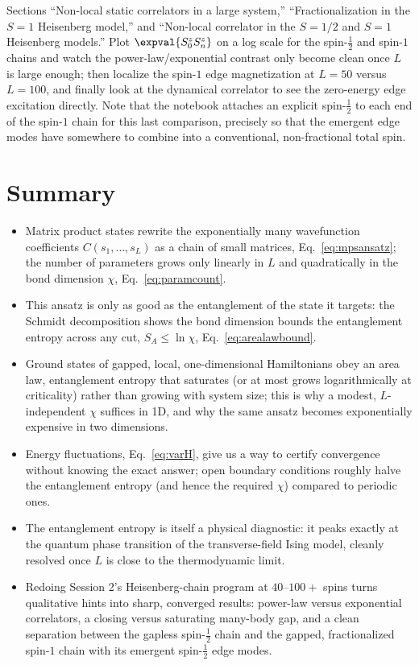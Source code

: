 \documentclass[all_sessions.tex]{subfiles}
\begin{document}
\begin{notebook}
Sections ``Non-local static correlators in a large system,'' ``Fractionalization in the $S=1$
Heisenberg model,'' and ``Non-local correlator in the $S=1/2$ and $S=1$ Heisenberg models.'' Plot
$\expval{S_0^zS_n^z}$ on a log scale for the spin-$\tfrac12$ and spin-$1$ chains and watch the
power-law/exponential contrast only become clean once $L$ is large enough; then localize the
spin-$1$ edge magnetization at $L=50$ versus $L=100$, and finally look at the dynamical correlator
to see the zero-energy edge excitation directly. Note that the notebook attaches an explicit
spin-$\tfrac12$ to each end of the spin-$1$ chain for this last comparison, precisely so that the
emergent edge modes have somewhere to combine into a conventional, non-fractional total spin.
\end{notebook}

\section*{Summary}
\begin{itemize}[nosep]
  \item Matrix product states rewrite the exponentially many wavefunction coefficients
    $C(s_1,\ldots,s_L)$ as a chain of small matrices, Eq.~\eqref{eq:mpsansatz}; the number of
    parameters grows only linearly in $L$ and quadratically in the bond dimension $\chi$,
    Eq.~\eqref{eq:paramcount}.
  \item This ansatz is only as good as the entanglement of the state it targets: the Schmidt
    decomposition shows the bond dimension bounds the entanglement entropy across any cut,
    $S_A \le \ln\chi$, Eq.~\eqref{eq:arealawbound}.
  \item Ground states of gapped, local, one-dimensional Hamiltonians obey an area law, entanglement
    entropy that saturates (or at most grows logarithmically at criticality) rather than growing
    with system size; this is why a modest, $L$-independent $\chi$ suffices in 1D, and why the same
    ansatz becomes exponentially expensive in two dimensions.
  \item Energy fluctuations, Eq.~\eqref{eq:varH}, give us a way to certify convergence without
    knowing the exact answer; open boundary conditions roughly halve the entanglement entropy (and
    hence the required $\chi$) compared to periodic ones.
  \item The entanglement entropy is itself a physical diagnostic: it peaks exactly at the quantum
    phase transition of the transverse-field Ising model, cleanly resolved once $L$ is close to the
    thermodynamic limit.
  \item Redoing Session 2's Heisenberg-chain program at $40$--$100+$ spins turns qualitative hints
    into sharp, converged results: power-law versus exponential correlators, a closing versus
    saturating many-body gap, and a clean separation between the gapless spin-$\tfrac12$ chain and
    the gapped, fractionalized spin-$1$ chain with its emergent spin-$\tfrac12$ edge modes.
\end{itemize}
\end{document}
